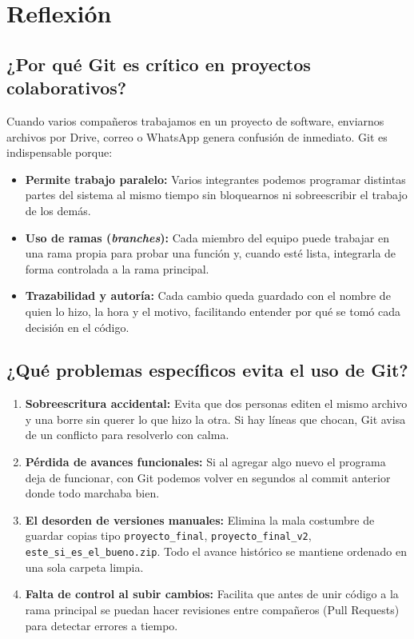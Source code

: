 \documentclass[11pt,a4paper]{article}
\begin{document}
\section{Reflexión}

\subsection{¿Por qué Git es crítico en proyectos colaborativos?}
Cuando varios compañeros trabajamos en un proyecto de software, enviarnos archivos por Drive, correo o WhatsApp genera confusión de inmediato. Git es indispensable porque:
\begin{itemize}
    \item \textbf{Permite trabajo paralelo:} Varios integrantes podemos programar distintas partes del sistema al mismo tiempo sin bloquearnos ni sobreescribir el trabajo de los demás.
    \item \textbf{Uso de ramas (\textit{branches}):} Cada miembro del equipo puede trabajar en una rama propia para probar una función y, cuando esté lista, integrarla de forma controlada a la rama principal.
    \item \textbf{Trazabilidad y autoría:} Cada cambio queda guardado con el nombre de quien lo hizo, la hora y el motivo, facilitando entender por qué se tomó cada decisión en el código.
\end{itemize}

\subsection{¿Qué problemas específicos evita el uso de Git?}
\begin{enumerate}
    \item \textbf{Sobreescritura accidental:} Evita que dos personas editen el mismo archivo y una borre sin querer lo que hizo la otra. Si hay líneas que chocan, Git avisa de un conflicto para resolverlo con calma.
    \item \textbf{Pérdida de avances funcionales:} Si al agregar algo nuevo el programa deja de funcionar, con Git podemos volver en segundos al commit anterior donde todo marchaba bien.
    \item \textbf{El desorden de versiones manuales:} Elimina la mala costumbre de guardar copias tipo \texttt{proyecto\_final}, \texttt{proyecto\_final\_v2}, \texttt{este\_si\_es\_el\_bueno.zip}. Todo el avance histórico se mantiene ordenado en una sola carpeta limpia.
    \item \textbf{Falta de control al subir cambios:} Facilita que antes de unir código a la rama principal se puedan hacer revisiones entre compañeros (Pull Requests) para detectar errores a tiempo.
\end{enumerate}
\end{document}
